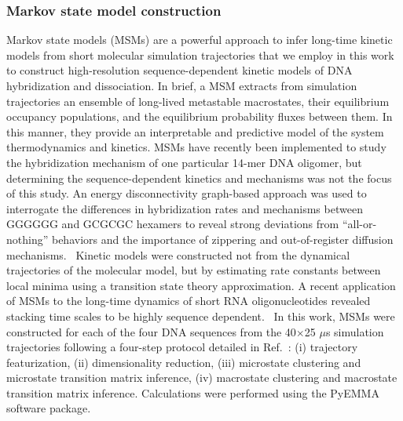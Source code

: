 \documentclass[journal=jpcbfk,manuscript=article]{achemso}
\newcommand*{\rood}[1]{{#1}}
\newcommand*{\roodr}[1]{{\color{red}{#1}}}
\begin{document}
\subsubsection{Markov state model construction}

Markov state models (MSMs) are a powerful approach to infer long-time kinetic models from short molecular simulation trajectories \citep{Sengupta2019AutomatedSelf-assembly, Pande2010EverythingAsk, Chodera2014MarkovDynamics, Husic2018MarkovScience, Wehmeyer2019IntroductionSoftware} that we employ in this work to construct high-resolution sequence-dependent kinetic models of DNA hybridization and dissociation. In brief, a MSM extracts from simulation trajectories an ensemble of long-lived metastable macrostates, their equilibrium occupancy populations, and the equilibrium probability fluxes between them. In this manner, they provide an interpretable and predictive model of the system thermodynamics and kinetics. MSMs have recently been implemented to study the hybridization mechanism of one particular 14-mer DNA oligomer, but determining the sequence-dependent kinetics and mechanisms was not the focus of this study.\citep{Jin2019} An energy disconnectivity graph-based approach was used to interrogate the differences in hybridization rates and mechanisms between GGGGGG and GCGCGC hexamers to reveal strong deviations from ``all-or-nothing'' behaviors and the importance of zippering and \rood{out-of-register diffusion mechanisms}.~\citep{Xiao2019} Kinetic models were constructed not from the dynamical trajectories of the molecular model, but by estimating rate constants between local minima using a transition state theory approximation. A recent application of MSMs to the long-time dynamics of short RNA oligonucleotides revealed stacking time scales to be highly sequence dependent.~\citep{Pinamonti2017} In this work,  MSMs were constructed for each of the four DNA sequences \roodr{at their respective 3SPN.2 melting temperatures at 7 mM concentration} from the 40$\times$25 $\mu$s simulation trajectories following a four-step protocol detailed in Ref.~\citep{Sidky2019High-ResolutionVAMPnets}: (i) trajectory featurization, (ii) dimensionality reduction, (iii) microstate clustering and microstate transition matrix inference, (iv) macrostate clustering and macrostate transition matrix inference. Calculations were performed using the PyEMMA software package. \citep{Scherer2015PyEMMAModels}
\end{document}
